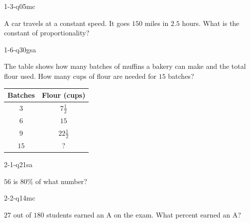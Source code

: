 
\begin{practiceQuestion}{1-3-q05}{mc}
\begin{questionText}
A car travels at a constant speed. It goes $150$ miles in $2.5$ hours. What is the constant of proportionality?
\end{questionText}
\end{practiceQuestion}

\begin{practiceQuestion}{1-6-q30}{gsa}
\begin{questionText}
The table shows how many batches of muffins a bakery can make and the total flour used. How many cups of flour are needed for $15$ batches?

\begin{center}
\begin{tabular}{|c|c|}
\hline
\textbf{Batches} & \textbf{Flour (cups)} \\ \hline
$3$ & $7\frac{1}{2}$ \\ \hline
$6$ & $15$ \\ \hline
$9$ & $22\frac{1}{2}$ \\ \hline
$15$ & $?$ \\ \hline
\end{tabular}
\end{center}
\end{questionText}
\end{practiceQuestion}

\begin{practiceQuestion}{2-1-q21}{sa}
\begin{questionText}
$56$ is $80\%$ of what number?
\end{questionText}
\end{practiceQuestion}

\begin{practiceQuestion}{2-2-q14}{mc}
\begin{questionText}
$27$ out of $180$ students earned an A on the exam. What percent earned an A?
\end{questionText}
\end{practiceQuestion}


